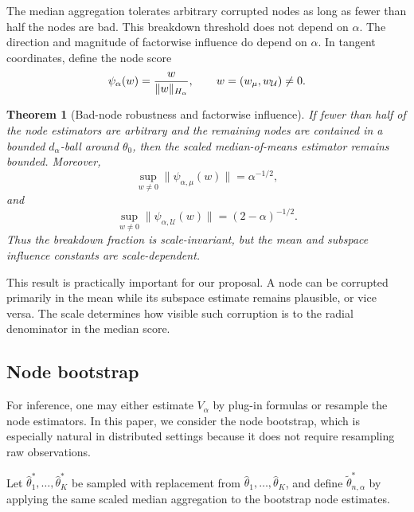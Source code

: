 \documentclass[11pt]{article}
\newtheorem{theorem}{Theorem}
\newcommand{\U}{\mathcal U}
\begin{document}
The median aggregation tolerates arbitrary corrupted nodes as long as fewer than half the nodes are bad.  This breakdown threshold does not depend on \(\alpha\).  The direction and magnitude of factorwise influence do depend on \(\alpha\).  In tangent coordinates, define the node score
\begin{equation}\label{eq:psi-alpha}
    \psi_\alpha(w)={w\over \|w\|_{H_\alpha}},
    \qquad w=(w_\mu,w_\U)\ne0.
\end{equation}

\begin{theorem}[Bad-node robustness and factorwise influence]\label{thm:influence}
If fewer than half of the node estimators are arbitrary and the remaining nodes are contained in a bounded \(d_\alpha\)-ball around \(\theta_0\), then the scaled median-of-means estimator remains bounded.  Moreover,
\begin{equation}\label{eq:influence-mean}
    \sup_{w\ne0}\|\psi_{\alpha,\mu}(w)\|=\alpha^{-1/2},
\end{equation}
 and
\begin{equation}\label{eq:influence-subspace}
    \sup_{w\ne0}\|\psi_{\alpha,\U}(w)\|=(2-\alpha)^{-1/2}.
\end{equation}
Thus the breakdown fraction is scale-invariant, but the mean and subspace influence constants are scale-dependent.
\end{theorem}

This result is practically important for our proposal.  A node can be corrupted primarily in the mean while its subspace estimate remains plausible, or vice versa.  The scale determines how visible such corruption is to the radial denominator in the median score.

\subsection{Node bootstrap}

For inference, one may either estimate \(V_\alpha\) by plug-in formulas or resample the node estimators.  In this paper, we consider the node bootstrap, which is especially natural in distributed settings because it does not require resampling raw observations.

Let \(\widehat\theta_1^*,\ldots,\widehat\theta_K^*\) be sampled with replacement from \(\widehat\theta_1,
\ldots,\widehat\theta_K\), and define \(\widetilde\theta_{n,\alpha}^*\) by applying the same scaled median aggregation to the bootstrap node estimates.
\end{document}
